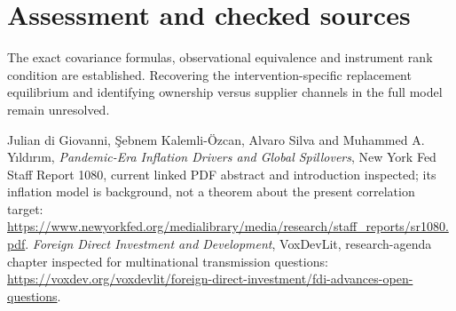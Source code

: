 \documentclass[11pt]{article}
\begin{document}
\section{Assessment and checked sources}
The exact covariance formulas, observational equivalence and instrument rank condition are established. Recovering the intervention-specific replacement equilibrium and identifying ownership versus supplier channels in the full model remain unresolved.

Julian di Giovanni, \c{S}ebnem Kalemli-\"Ozcan, Alvaro Silva and Muhammed A. Y\i ld\i r\i m, \emph{Pandemic-Era Inflation Drivers and Global Spillovers}, New York Fed Staff Report 1080, current linked PDF abstract and introduction inspected; its inflation model is background, not a theorem about the present correlation target:
\url{https://www.newyorkfed.org/medialibrary/media/research/staff_reports/sr1080.pdf}.
\emph{Foreign Direct Investment and Development}, VoxDevLit, research-agenda chapter inspected for multinational transmission questions:
\url{https://voxdev.org/voxdevlit/foreign-direct-investment/fdi-advances-open-questions}.
\end{document}
